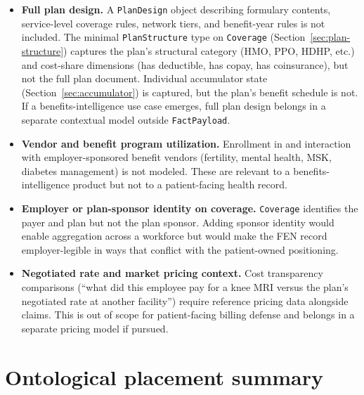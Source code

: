 \documentclass[11pt]{article}
\begin{document}
\begin{itemize}

\item \textbf{Full plan design.} A \texttt{PlanDesign} object
describing formulary contents, service-level coverage rules, network
tiers, and benefit-year rules is not included. The minimal
\texttt{PlanStructure} type on \texttt{Coverage}
(Section~\ref{sec:plan-structure}) captures the plan's structural
category (HMO, PPO, HDHP, etc.) and cost-share dimensions (has
deductible, has copay, has coinsurance), but not the full plan
document. Individual accumulator state
(Section~\ref{sec:accumulator}) is captured, but the plan's benefit
schedule is not. If a benefits-intelligence use case emerges, full
plan design belongs in a separate contextual model outside
\texttt{FactPayload}.

\item \textbf{Vendor and benefit program utilization.} Enrollment in and
interaction with employer-sponsored benefit vendors (fertility, mental
health, MSK, diabetes management) is not modeled. These are relevant
to a benefits-intelligence product but not to a patient-facing health
record.

\item \textbf{Employer or plan-sponsor identity on coverage.}
\texttt{Coverage} identifies the payer and plan but not the plan
sponsor. Adding sponsor identity would enable aggregation across a
workforce but would make the FEN record employer-legible in ways that
conflict with the patient-owned positioning.

\item \textbf{Negotiated rate and market pricing context.} Cost
transparency comparisons (``what did this employee pay for a knee MRI
versus the plan's negotiated rate at another facility'') require
reference pricing data alongside claims. This is out of scope for
patient-facing billing defense and belongs in a separate pricing model
if pursued.

\end{itemize}

\section{Ontological placement summary}
\end{document}
